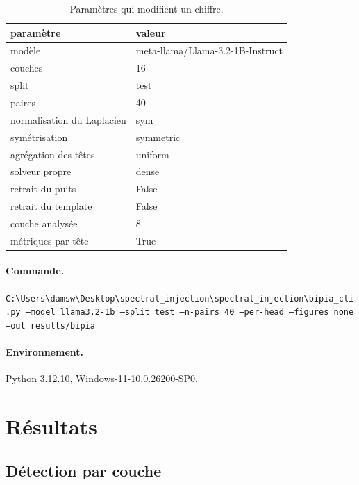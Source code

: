 \documentclass[11pt,a4paper]{article}
\begin{document}
\begin{table}[htbp]\centering\small
\begin{tabular}{ll}
\hline
paramètre & valeur \\
\hline
modèle & meta-llama/Llama-3.2-1B-Instruct \\
couches & 16 \\
split & test \\
paires & 40 \\
normalisation du Laplacien & sym \\
symétrisation & symmetric \\
agrégation des têtes & uniform \\
solveur propre & dense \\
retrait du puits & False \\
retrait du template & False \\
couche analysée & 8 \\
métriques par tête & True \\
\hline
\end{tabular}
\caption{Paramètres qui modifient un chiffre.}
\label{tab:config}
\end{table}


\paragraph{Commande.}
\texttt{C:\textbackslash{}Users\textbackslash{}damsw\textbackslash{}Desktop\textbackslash{}spectral\_injection\textbackslash{}spectral\_injection\textbackslash{}bipia\_cli.py --model llama3.2-1b --split test --n-pairs 40 --per-head --figures none --out results/bipia}

\paragraph{Environnement.}
Python 3.12.10, Windows-11-10.0.26200-SP0.


\section{Résultats}

\subsection{Détection par couche}
\end{document}
